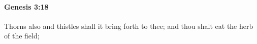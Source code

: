 
		\paragraph{Genesis 3:18} %
			\label{GENESIS-3-18}

			Thorns also and thistles shall it bring forth to thee; and thou shalt eat the herb of the field;



